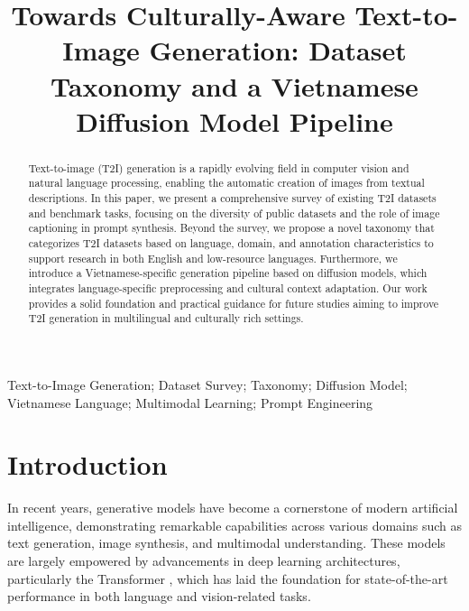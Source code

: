 \documentclass[conference]{IEEEtran}
\begin{document}
\title{Towards Culturally-Aware Text-to-Image Generation: Dataset Taxonomy and a Vietnamese Diffusion Model Pipeline}

\author{
}

\maketitle

\begin{abstract}
Text-to-image (T2I) generation is a rapidly evolving field in computer vision and natural language processing, enabling the automatic creation of images from textual descriptions. In this paper, we present a comprehensive survey of existing T2I datasets and benchmark tasks, focusing on the diversity of public datasets and the role of image captioning in prompt synthesis. Beyond the survey, we propose a novel taxonomy that categorizes T2I datasets based on language, domain, and annotation characteristics to support research in both English and low-resource languages. Furthermore, we introduce a Vietnamese-specific generation pipeline based on diffusion models, which integrates language-specific preprocessing and cultural context adaptation. Our work provides a solid foundation and practical guidance for future studies aiming to improve T2I generation in multilingual and culturally rich settings.
\end{abstract}

\begin{IEEEkeywords}
Text-to-Image Generation; Dataset Survey; Taxonomy; Diffusion Model; Vietnamese Language; Multimodal Learning; Prompt Engineering
\end{IEEEkeywords}

\section{Introduction}
In recent years, generative models have become a cornerstone of modern artificial intelligence, demonstrating remarkable capabilities across various domains such as text generation, image synthesis, and multimodal understanding. These models are largely empowered by advancements in deep learning architectures, particularly the Transformer \cite{vaswani2023attentionneed}, which has laid the foundation for state-of-the-art performance in both language and vision-related tasks.
\end{document}
